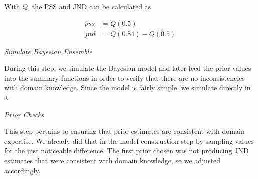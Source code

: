 \documentclass[11pt, oneside, openany]{scrbook}
\newenvironment{Shaded}{\begin{snugshade}}{\end{snugshade}}
\newcommand{\DataTypeTok}[1]{\textcolor[rgb]{0.13,0.29,0.53}{#1}}
\newcommand{\DecValTok}[1]{\textcolor[rgb]{0.00,0.00,0.81}{#1}}
\newcommand{\FloatTok}[1]{\textcolor[rgb]{0.00,0.00,0.81}{#1}}
\newcommand{\KeywordTok}[1]{\textcolor[rgb]{0.13,0.29,0.53}{\textbf{#1}}}
\newcommand{\NormalTok}[1]{#1}
\newcommand{\OperatorTok}[1]{\textcolor[rgb]{0.81,0.36,0.00}{\textbf{#1}}}
\newcommand{\OtherTok}[1]{\textcolor[rgb]{0.56,0.35,0.01}{#1}}
\newcommand{\StringTok}[1]{\textcolor[rgb]{0.31,0.60,0.02}{#1}}
\begin{document}
With \(Q\), the PSS and JND can be calculated as


\begin{align*}
  pss &= Q(0.5) \\
  jnd &= Q(0.84) - Q(0.5)
\end{align*}

\emph{Simulate Bayesian Ensemble}

During this step, we simulate the Bayesian model and later feed the prior values into the summary functions in order to verify that there are no inconsistencies with domain knowledge. Since the model is fairly simple, we simulate directly in \texttt{R}.


\begin{Shaded}
\end{Shaded}


\emph{Prior Checks}

This step pertains to ensuring that prior estimates are consistent with domain expertise. We already did that in the model construction step by sampling values for the just noticeable difference. The first prior chosen was not producing JND estimates that were consistent with domain knowledge, so we adjusted accordingly.
\end{document}
